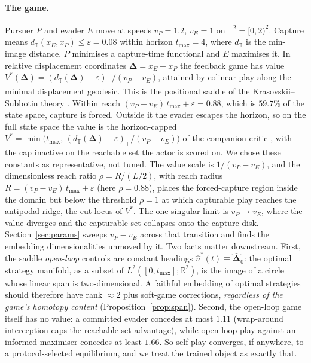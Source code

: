 \documentclass[twoside,11pt]{article}
\newcommand{\Dl}{\bm{\Delta}}
\newcommand{\TT}{\mathbb{T}^{2}}
\newcommand{\RR}{\mathbb{R}}
\begin{document}
\paragraph{The game.}  Pursuer $P$ and evader $E$ move at speeds
$v_P = 1.2$, $v_E = 1$ on $\TT = [0, 2)^{2}$.  Capture means
$d_{\mathbb{T}}(x_E, x_P) \le \varepsilon = 0.08$ within horizon
$t_{\max} = 4$, where $d_{\mathbb{T}}$ is the min-image distance.  $P$
minimises a capture-time functional and $E$ maximises it.  In relative
displacement coordinates $\Dl = x_E - x_P$ the feedback game has
value $V^{*}(\Dl) =
(d_{\mathbb{T}}(\Dl) - \varepsilon)_{+}/(v_P - v_E)$, attained by
colinear play along the minimal displacement geodesic.  This is the
positional saddle of the Krasovskii--Subbotin theory
\citep{krasovskii_subbotin1988}.  Within reach
$(v_P - v_E)\,t_{\max} + \varepsilon = 0.88$, which is $59.7\%$ of the
state space, capture is forced.  Outside it the evader escapes the
horizon, so on the full state space the value is the horizon-capped
$V^{*} = \min\bigl(t_{\max},\,(d_{\mathbb{T}}(\Dl) - \varepsilon)_{+}/(v_P - v_E)\bigr)$
of the companion critic \citep{companion2026critics}, with the cap
inactive on the reachable set the actor is scored on.  We chose these
constants as representative, not tuned.  The value scale is
$1/(v_P - v_E)$, and the dimensionless reach ratio
$\rho = R/(L/2)$, with reach radius $R = (v_P - v_E)\,t_{\max} +
\varepsilon$ (here $\rho = 0.88$), places the forced-capture
region inside the domain but below the threshold $\rho = 1$ at which
capturable play reaches the antipodal ridge, the cut locus of $V^{*}$.
The one singular limit is $v_P \to v_E$, where the value diverges
and the capturable set collapses onto the capture disk.
Section~\ref{sec:params} sweeps $v_P - v_E$ across that transition and
finds the embedding dimensionalities unmoved by it.  Two facts matter
downstream.  First, the saddle
\emph{open-loop} controls are constant headings
$\hat u^{*}(t) \equiv \widehat{\Dl}_0$: the optimal strategy
manifold, as a subset of $L^{2}([0, t_{\max}]; \RR^{2})$, is the
image of a circle whose linear span is two-dimensional.  A faithful
embedding of optimal strategies should therefore have rank
$\approx 2$ plus soft-game corrections, \emph{regardless of the
game's homotopy content} (Proposition~\ref{prop:span}).  Second, the
open-loop game itself has no value: a committed evader concedes at
most $1.11$ (wrap-around interception caps the reachable-set
advantage), while open-loop play against an informed maximiser
concedes at least $1.66$.  So self-play converges, if anywhere,
to a protocol-selected equilibrium, and we treat the trained object
as exactly that.
\end{document}
